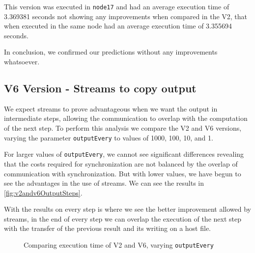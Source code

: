 \documentclass[conference]{IEEEtran}
\begin{document}
This version was executed in \texttt{node17} and had an average execution time of 3.369381 seconds not showing any improvements when compared in the V2, that when executed in the same node had an average execution time of 3.355694 seconds.

In conclusion, we confirmed our predictions without any improvements whatsoever.


\subsection{V6 Version - Streams to copy output}
We expect streams to prove advantageous when we want the output in intermediate steps, allowing the communication to overlap with the computation of the next step. To perform this analysis we compare the V2 and V6 versions, varying the parameter \texttt{outputEvery} to values of 1000, 100, 10, and 1.

For larger values of \texttt{outputEvery}, we cannot see significant differences revealing that the costs required for synchronization are not balanced by the overlap of communication with synchronization. But with lower values, we have begun to see the advantages in the use of streams. We can see the results in \autoref{fig:v2andv6OutputSteps}.

With the results on every step is where we see the better improvement allowed by streams, in the end of every step we can overlap the execution of the next step with the transfer of the previous result and its writing on a host file.


\begin{figure}[ht]
  \centering
  \caption{Comparing execution time of V2 and V6, varying \texttt{outputEvery}}
  \label{fig:v2andv6OutputSteps}
\end{figure}
\end{document}
